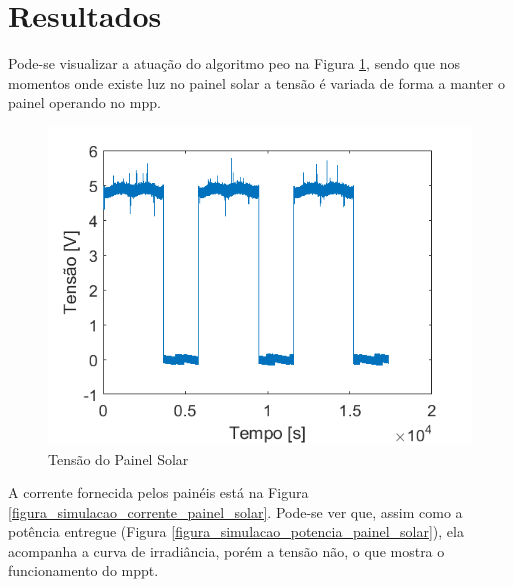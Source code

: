 \section{Resultados}

Pode-se visualizar a atuação do algoritmo \gls{peo} na Figura \ref{figura_simulacao_tensao_painel_solar}, sendo que nos momentos onde existe luz no painel solar a tensão é variada de forma a manter o painel operando no \gls{mpp}.

\begin{figure}[!htpb]
\begin{center}
\includegraphics[scale=0.5]{figures/simulatedSolarPanelVoltage.png}
\caption{Tensão do Painel Solar}
\label{figura_simulacao_tensao_painel_solar}
\end{center}
\end{figure}

A corrente fornecida pelos painéis está na Figura \ref{figura_simulacao_corrente_painel_solar}. Pode-se ver que, assim como a potência entregue (Figura \ref{figura_simulacao_potencia_painel_solar}), ela acompanha a curva de irradiância, porém a tensão não, o que mostra o funcionamento do \gls{mppt}. 

